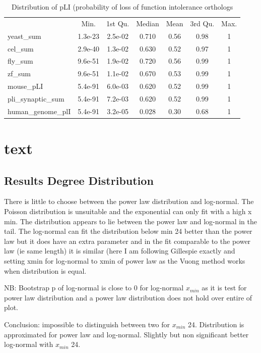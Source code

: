 \begin{table}[ht]
    \centering
    \begin{tabular}{lcccccc}
    &                 Min.& 1st Qu. &Median& Mean& 3rd Qu.& Max.\\
yeast\_sum   &     1.3e-23& 2.5e-02&  0.710& 0.56&    0.98 &   1\\
cel\_sum     &     2.9e-40& 1.3e-02&  0.630& 0.52&    0.97 &  1\\
fly\_sum      &    9.6e-51 &1.9e-02&  0.720& 0.56&    0.99 &  1\\
zf\_sum        &   9.6e-51& 1.1e-02&  0.670& 0.53&    0.99  &  1\\
mouse\_pLI      &  5.4e-91 &6.0e-03&  0.620& 0.52&    0.99   &1\\
pli\_synaptic\_sum & 5.4e-91 &7.2e-03&  0.620& 0.52&    0.99  &  1\\
human\_genome\_plI &5.4e-91 &3.2e-05&  0.028& 0.30&    0.68  &  1\\
  
    \end{tabular}
    \caption{Distribution of pLI (probability of loss of function intolerance orthologs}
    \label{tab:pLI orthologs}
\end{table}
\section{text}
\subsection{Results Degree Distribution}
  There is little to choose between the power law distribution and log-normal. The Poisson distribution is unsuitable and the exponential can only fit with a high x min. The distribution appears to lie between the power law and log-normal in the tail. The log-normal can fit the distribution below min 24 better than the power law but it does have an extra parameter and in the fit comparable to the power law (ie same length) it is similar (here I am following Gillespie exactly and setting xmin for log-normal to xmin of power law as the Vuong method works when distribution is equal. 
  
  NB: Bootstrap p of log-normal is close to 0 for log-normal $x_{min}$ as it is test for power law distribution and a power law distribution does not hold over entire of plot.
  
  Conclusion: impossible to distinguish between two for $x_{min}$ 24. Distribution is approximated for power law and log-normal. Slightly but non significant better log-normal with $x_{min}$ 24.
  
